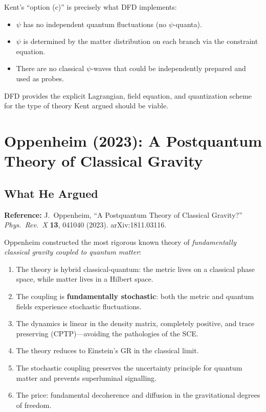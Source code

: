 \documentclass[12pt,a4paper]{article}
\begin{document}
Kent's ``option (c)'' is precisely what DFD implements:
\begin{itemize}
\item $\psi$ has no independent quantum fluctuations (no $\psi$-quanta).
\item $\psi$ is determined by the matter distribution on each branch via the constraint equation.
\item There are no classical $\psi$-waves that could be independently prepared and used as probes.
\end{itemize}

DFD provides the explicit Lagrangian, field equation, and quantization scheme for the type of theory Kent argued should be viable.


\section{Oppenheim (2023): A Postquantum Theory of Classical Gravity}
\label{sec:oppenheim}

\subsection{What He Argued}

\textbf{Reference:} J.\ Oppenheim, ``A Postquantum Theory of Classical Gravity?'' \textit{Phys.\ Rev.\ X} \textbf{13}, 041040 (2023). arXiv:1811.03116.

Oppenheim constructed the most rigorous known theory of \emph{fundamentally classical gravity coupled to quantum matter}:

\begin{enumerate}
\item The theory is hybrid classical-quantum: the metric lives on a classical phase space, while matter lives in a Hilbert space.
\item The coupling is \textbf{fundamentally stochastic}: both the metric and quantum fields experience stochastic fluctuations.
\item The dynamics is linear in the density matrix, completely positive, and trace preserving (CPTP)---avoiding the pathologies of the SCE.
\item The theory reduces to Einstein's GR in the classical limit.
\item The stochastic coupling preserves the uncertainty principle for quantum matter and prevents superluminal signalling.
\item The price: fundamental decoherence and diffusion in the gravitational degrees of freedom.
\end{enumerate}
\end{document}
